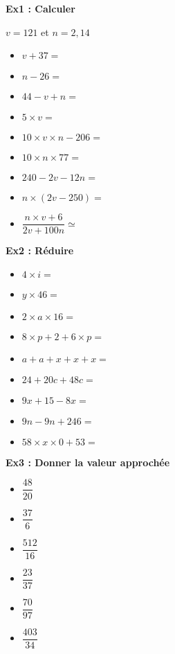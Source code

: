\begin{multicols}{3}

\textbf{Ex1 : Calculer}

$v = 121$ et $n = 2,14$

\begin{itemize}[label={$\bullet$}]
  \item $v + 37 = $ \dotfill
  \item $n - 26 = $ \dotfill
  \item $44 - v + n= $ \dotfill
  \item $5 \times v = $ \dotfill
  \item $10 \times v \times n - 206 = $ \dotfill
  \item $10 \times  n \times 77 = $ \dotfill
  \item $240 - 2v - 12n = $ \dotfill
  \item $n \times (2v - 250) = $ \dotfill
  \item $\dfrac{n \times v + 6}{2v + 100n} \simeq$ \dotfill
\end{itemize} \columnbreak 

\textbf{Ex2 : Réduire}

\begin{itemize}[label={$\bullet$}]
  \item $ 4 \times i = $ \dotfill
  \item $ y \times 46 = $ \dotfill
  \item $ 2 \times  a \times 16 = $ \dotfill
  \item $ 8 \times p + 2 + 6 \times p = $ \dotfill
  \item $ a + a + x + x + x = $ \dotfill
  \item $ 24 + 20c + 48c = $ \dotfill
  \item $ 9x + 15 - 8x = $ \dotfill
  \item $ 9n - 9n + 246 = $ \dotfill
  \item $ 58 \times x \times 0 + 53 = $ \dotfill
\end{itemize} \columnbreak 

\textbf{Ex3 : Donner la valeur approchée}

\begin{itemize}[label={$\bullet$}]
  \item $ \dfrac{48}{20}    $ \dotfill \\
  \item $ \dfrac{37}{6}     $ \dotfill \\ 
  \item $ \dfrac{512}{16}   $ \dotfill \\
  \item $ \dfrac{23}{37}    $ \dotfill \\
  \item $ \dfrac{70}{97}    $ \dotfill \\
  \item $ \dfrac{403}{34} $ \dotfill \\
\end{itemize}

\end{multicols}

